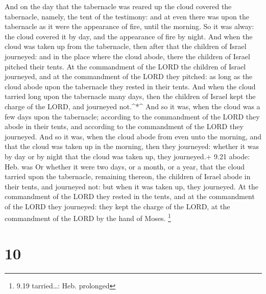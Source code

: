  And on the day that the tabernacle was reared up the cloud
covered the tabernacle, namely, the tent of the testimony: and at even
there was upon the tabernacle as it were the appearance of fire, until
the morning.  So it was alway: the cloud covered it by day,
and the appearance of fire by night.  And when the cloud
was taken up from the tabernacle, then after that the children of Israel
journeyed: and in the place where the cloud abode, there the children of
Israel pitched their tents.  At the commandment of the LORD
the children of Israel journeyed, and at the commandment of the LORD
they pitched: as long as the cloud abode upon the tabernacle they rested
in their tents.  And when the cloud tarried long upon the
tabernacle many days, then the children of Israel kept the charge of the
LORD, and journeyed not.\^{}*\^{}  And so it was, when the
cloud was a few days upon the tabernacle; according to the commandment
of the LORD they abode in their tents, and according to the commandment
of the LORD they journeyed.  And so it was, when the cloud
abode from even unto the morning, and that the cloud was taken up in the
morning, then they journeyed: whether it was by day or by night that the
cloud was taken up, they journeyed.+ 9.21 abode: Heb. was 
Or whether it were two days, or a month, or a year, that the cloud
tarried upon the tabernacle, remaining thereon, the children of Israel
abode in their tents, and journeyed not: but when it was taken up, they
journeyed.  At the commandment of the LORD they rested in
the tents, and at the commandment of the LORD they journeyed: they kept
the charge of the LORD, at the commandment of the LORD by the hand of
Moses. \footnote{9.19 tarried\ldots: Heb. prolonged}

\hypertarget{section-9}{%
\section{10}\label{section-9}}

